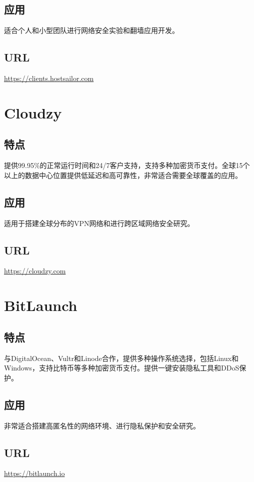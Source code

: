 \documentclass[11pt]{article}
\begin{document}
\subsection{应用}
\label{sec:orga5604d7}
适合个人和小型团队进行网络安全实验和翻墙应用开发。
\subsection{URL}
\label{sec:org93ce41d}
\url{https://clients.hostsailor.com}

\section{Cloudzy}
\label{sec:org6e7568a}
\subsection{特点}
\label{sec:org6617cce}
提供99.95\%的正常运行时间和24/7客户支持，支持多种加密货币支付。全球15个以上的数据中心位置提供低延迟和高可靠性，非常适合需要全球覆盖的应用。
\subsection{应用}
\label{sec:org4bbbc88}
适用于搭建全球分布的VPN网络和进行跨区域网络安全研究。
\subsection{URL}
\label{sec:orge3901a1}
\url{https://cloudzy.com}

\section{BitLaunch}
\label{sec:orgf68a508}
\subsection{特点}
\label{sec:org8ba8678}
与DigitalOcean、Vultr和Linode合作，提供多种操作系统选择，包括Linux和Windows，支持比特币等多种加密货币支付。提供一键安装隐私工具和DDoS保护。
\subsection{应用}
\label{sec:orga8cd004}
非常适合搭建高匿名性的网络环境、进行隐私保护和安全研究。
\subsection{URL}
\label{sec:org79810dc}
\url{https://bitlaunch.io}
\end{document}
